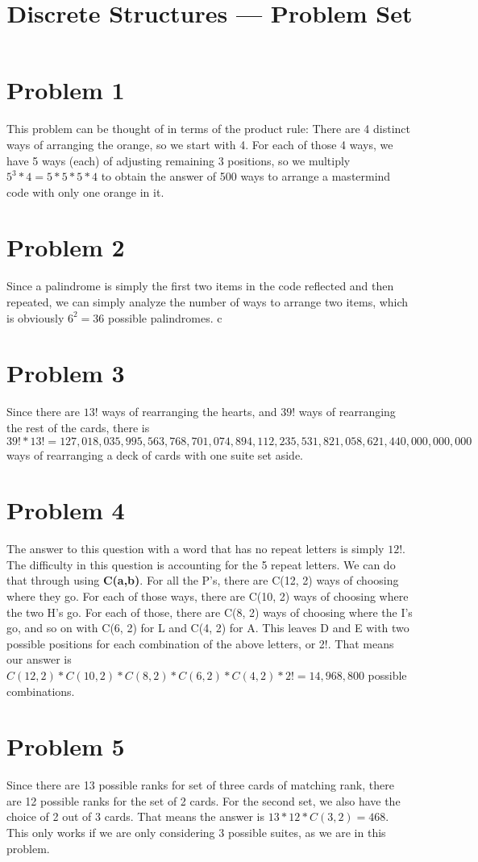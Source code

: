 \documentclass[11pt]{article}
\title{Discrete Structures --- Problem Set \Homework}
\author{\Name}
\date{}
\begin{document}
\maketitle

\section*{Problem 1}
This problem can be thought of in terms of the product rule: There are 4 distinct ways of arranging the orange, so we start with 4. For each of those 4 ways, we have 5 ways (each) of adjusting remaining 3 positions, so we multiply $5^3 * 4 = 5 * 5 * 5 * 4$ to obtain the answer of 500 ways to arrange a mastermind code with only one orange in it.

\section*{Problem 2}
Since a palindrome is simply the first two items in the code reflected and then repeated, we can simply analyze the number of ways to arrange two items, which is obviously $6^2 = 36$ possible palindromes.
c
\section*{Problem 3}
Since there are $13!$ ways of rearranging the hearts, and $39!$ ways of rearranging the rest of the cards, there is $39! * 13! = 127,018,035,995,563,768,701,074,894,112,235,531,821,058,621,440,000,000,000$ ways of rearranging a deck of cards with one suite set aside.

\section*{Problem 4}
The answer to this question with a word that has no repeat letters is simply $12!$. The difficulty in this question is accounting for the 5 repeat letters. We can do that through using \textbf{C(a,b)}. For all the P's, there are C(12, 2) ways of choosing where they go. For each of those ways, there are C(10, 2) ways of choosing where the two H's go. For each of those, there are C(8, 2) ways of choosing where the I's go, and so on with C(6, 2) for L and C(4, 2) for A. This leaves D and E with two possible positions for each combination of the above letters, or 2!. That means our answer is $C(12, 2) * C(10, 2) * C(8, 2) * C(6, 2) * C(4, 2) * 2! = 14,968,800$ possible combinations.

\section*{Problem 5}
Since there are 13 possible ranks for set of three cards of matching rank, there are 12 possible ranks for the set of 2 cards. For the second set, we also have the choice of 2 out of 3 cards. That means the answer is $13 * 12 * C(3, 2) = 468$. This only works if we are only considering 3 possible suites, as we are in this problem.
\end{document}
